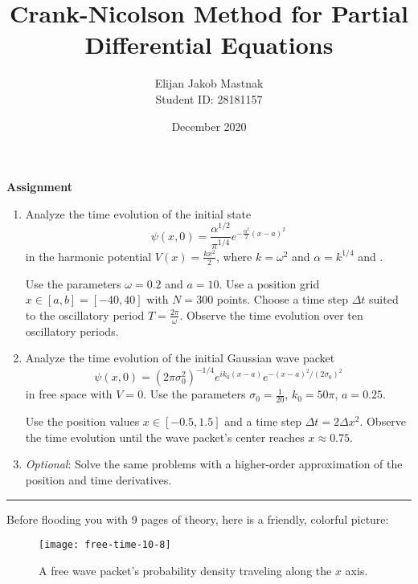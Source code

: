 \documentclass[11pt, a4paper]{article}
\begin{document}
\title{Crank-Nicolson Method for Partial Differential Equations}
\author{Elijan Jakob Mastnak\\[1mm]\small{Student ID: 28181157}}
\date{December 2020}
\maketitle

\tableofcontents

\newpage
\begin{center}
\textbf{Assignment}
\begin{enumerate}
	\item Analyze the time evolution of the initial state
	\begin{equation*}
		\psi(x, 0) = \frac{\alpha^{1/2}}{\pi^{1/4}}e^{-\frac{\alpha^{2}}{2}(x - a)^{2}}
	\end{equation*}
	in the harmonic potential $ V(x) = \frac{kx^{2}}{2} $, where $ k = \omega^{2} $ and $ \alpha = k^{1/4} $ and .
	
	Use the parameters $ \omega = 0.2 $ and $ a = 10 $. Use a position grid $ x \in [a, b] = [-40, 40] $ with $ N = 300 $ points. Choose a time step $ \Delta t $ suited to the oscillatory period $ T = \frac{2\pi}{\omega} $. Observe the time evolution over ten oscillatory periods.
	
	\item Analyze the time evolution of the initial Gaussian wave packet
	\begin{equation*}
		\psi(x, 0) = (2\pi \sigma_{0}^{2})^{-1/4}e^{ik_{0}(x - a)}e^{-(x - a)^{2}/(2\sigma_{0})^{2}}
	\end{equation*}
	in free space with $ V = 0 $. Use the parameters $ \sigma_{0} = \frac{1}{20} $, $ k_{0} = 50 \pi $, $ a = 0.25 $. 
	
	Use the position values $ x \in  [-0.5, 1.5] $ and a time step $ \Delta t = 2 \Delta x^{2} $. Observe the time evolution until the wave packet's center reaches $ x \approx 0.75 $. 
	
	
	\item \textit{Optional}: Solve the same problems with a higher-order approximation of the position and time derivatives.
\end{enumerate}
\end{center}

\rule{\textwidth}{0.2pt} 
\vspace{3mm}

Before flooding you with 9 pages of theory, here is a friendly, colorful picture:
\begin{figure}[htb!]
\centering
\texttt{[image: free-time-10-8]}
\caption{A free wave packet's probability density traveling along the $ x $ axis.}
\label{diff:fig:intro}
\end{figure}
\end{document}
